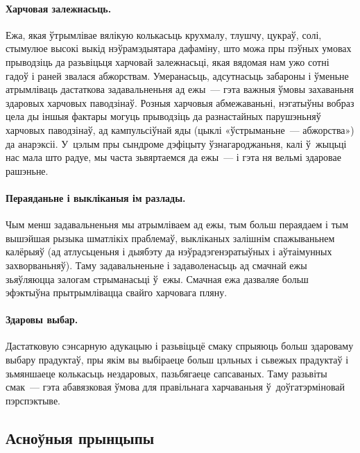 \paragraph{Харчовая залежнасьць.}
Ежа, якая ўтрымлівае вялікую колькасьць крухмалу, тлушчу, цукраў, солі, стымулюе высокі выкід нэўрамэдыятара дафаміну, што можа пры пэўных умовах прыводзіць да разьвіцьця харчовай залежнасьці, якая вядомая нам ужо сотні гадоў і раней звалася абжорствам. Умеранасьць, адсутнасьць забароны і ўменьне атрымліваць дастаткова задавальненьня ад ежы~--- гэта важныя ўмовы захаваньня здаровых харчовых паводзінаў. Розныя харчовыя абмежаваньні, нэгатыўны вобраз цела ды іншыя фактары могуць прыводзіць да разнастайных парушэньняў харчовых паводзінаў, ад кампульсіўнай яды (цыклі «ўстрыманьне~--- абжорства») да анарэксіі. У~цэлым пры сындроме дэфіцыту ўзнагароджаньня, калі ў~жыцьці нас мала што радуе, мы часта зьвяртаемся да ежы~--- і гэта ня вельмі здаровае рашэньне.


\paragraph{Пераяданьне і выкліканыя ім разлады.}
Чым менш задавальненьня мы атрымліваем ад ежы, тым больш пераядаем і тым вышэйшая рызыка шматлікіх праблемаў, выкліканых залішнім спажываньнем калёрыяў (ад атлусьценьня і дыябэту да нэўрадэгенэратыўных і аўтаімунных захворваньняў). Таму задавальненьне і задаволенасьць ад смачнай ежы зьяўляюцца залогам стрыманасьці ў~ежы. Смачная ежа дазваляе больш эфэктыўна прытрымлівацца свайго харчовага пляну.

\paragraph{Здаровы выбар.}
Дастатковую сэнсарную адукацыю і разьвіцьцё смаку спрыяюць больш здароваму выбару прадуктаў, пры якім вы выбіраеце больш цэльных і сьвежых прадуктаў і зьмяншаеце колькасьць нездаровых, пазьбягаеце сапсаваных. Таму разьвіты смак~--- гэта абавязковая ўмова для правільнага харчаваньня ў~доўгатэрміновай пэрспэктыве.

\subsection{Асноўныя прынцыпы}

